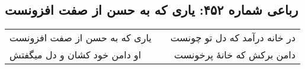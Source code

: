 \begin{center}
\section*{رباعی شماره ۴۵۲: یاری که به حسن از صفت افزونست}
\label{sec:0452}
\begin{longtable}{l p{0.5cm} r}
یاری که به حسن از صفت افزونست
&&
در خانه درآمد که دل تو چونست
\\
او دامن خود کشان و دل میگفتش
&&
دامن برکش که خانهٔ پرخونست
\\
\end{longtable}
\end{center}
